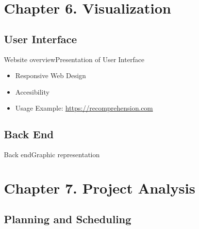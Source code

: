 \documentclass{beamer}
\begin{document}
\section{Chapter 6. Visualization}

\subsection{User Interface}

\begin{frame}{Website overview}{Presentation of User Interface}
  \begin{itemize}
    \item Responsive Web Design
    \item Accesibility
    \item Usage Example: \url{https://recomprehension.com}
  \end{itemize}
\end{frame}


\subsection{Back End}

\begin{frame}{Back end}{Graphic representation}
  \centering
  \scalebox{.6}{}
\end{frame}



\section{Chapter 7. Project Analysis}

\subsection{Planning and Scheduling}
\end{document}

